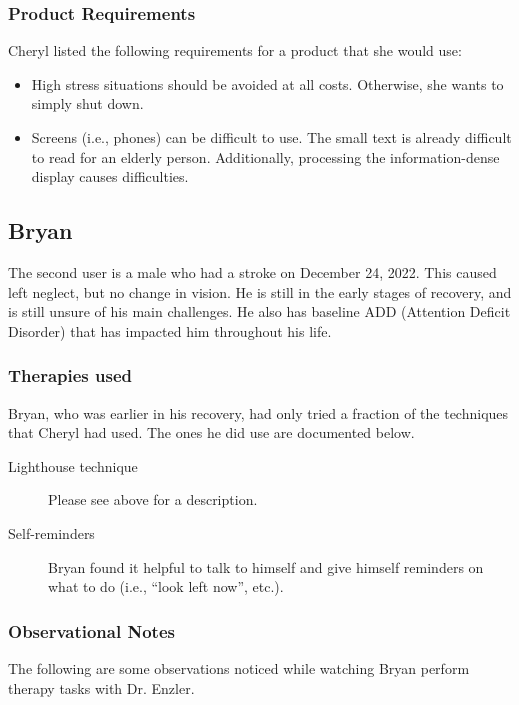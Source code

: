 \subsubsection{Product Requirements}

Cheryl listed the following requirements for a product that she would use:
\begin{itemize}
\item High stress situations should be avoided at all costs. Otherwise, she
  wants to simply shut down.
\item Screens (i.e., phones) can be difficult to use. The small text is already
  difficult to read for an elderly person. Additionally, processing the
  information-dense display causes difficulties.
\end{itemize}

\subsection{Bryan}

The second user is a male who had a stroke on December 24, 2022. This caused
left neglect, but no change in vision. He is still in the early stages of
recovery, and is still unsure of his main challenges. He also has baseline ADD
(Attention Deficit Disorder) that has impacted him throughout his life.

\subsubsection{Therapies used}

Bryan, who was earlier in his recovery, had only tried a fraction of the
techniques that Cheryl had used. The ones he did use are documented below.

\begin{description}
\item[Lighthouse technique] Please see above for a description.

\item[Self-reminders] Bryan found it helpful to talk to himself and give
  himself reminders on what to do (i.e., ``look left now'', etc.).
\end{description}

\subsubsection{Observational Notes}

The following are some observations noticed while watching Bryan perform
therapy tasks with Dr. Enzler.

